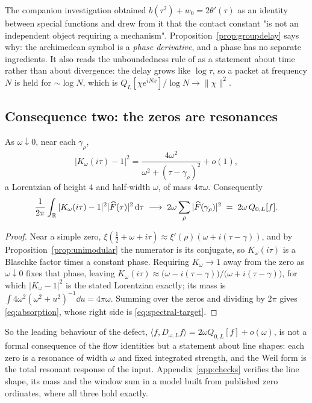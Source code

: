 The companion investigation obtained $b(\tau^2)+w_0=2\theta'(\tau)$ as an identity
between special functions and drew from it that the contact constant "is not an
independent object requiring a mechanism". Proposition~\ref{prop:groupdelay} says
why: the archimedean symbol is a \emph{phase derivative}, and a phase has no
separate ingredients. It also reads the unboundedness rule of \cite{Selection} as
a statement about time rather than about divergence: the delay grows like
$\log\tau$, so a packet at frequency $N$ is held for $\sim\log N$, which is
$Q_L[\chi e^{iNx}]/\log N\to\lVert\chi\rVert^2$.

\subsection{Consequence two: the zeros are resonances}

\begin{proposition}\label{prop:resonance}
As $\omega\downarrow0$, near each $\gamma_\rho$,
\[
 |K_\omega(i\tau)-1|^2=\frac{4\omega^2}{\omega^2+(\tau-\gamma_\rho)^2}+o(1),
\]
a Lorentzian of height $4$ and half-width $\omega$, of mass $4\pi\omega$.
Consequently
\begin{equation}\label{eq:absorption}
 \frac1{2\pi}\int_{\mathbb R}|K_\omega(i\tau)-1|^2|\widehat F(\tau)|^2\,\mathrm d\tau
 \;\longrightarrow\;2\omega\sum_\rho|\widehat F(\gamma_\rho)|^2
 \;=\;2\omega\,Q_{0,L}[f].
\end{equation}
\end{proposition}

\begin{proof}
Near a simple zero, $\xi(\frac12+\omega+i\tau)\approx\xi'(\rho)(\omega+i(\tau-\gamma))$,
and by Proposition~\ref{prop:unimodular} the numerator is its conjugate, so
$K_\omega(i\tau)$ is a Blaschke factor times a constant phase. Requiring
$K_\omega\to1$ away from the zero as $\omega\downarrow0$ fixes that phase, leaving
$K_\omega(i\tau)\approx\big(\omega-i(\tau-\gamma)\big)/\big(\omega+i(\tau-\gamma)\big)$,
for which $|K_\omega-1|^2$ is the stated Lorentzian exactly; its mass is
$\int4\omega^2(\omega^2+u^2)^{-1}\dd u=4\pi\omega$. Summing over the zeros and
dividing by $2\pi$ gives \eqref{eq:absorption}, whose right side is
\eqref{eq:spectral-target}.
\end{proof}

So the leading behaviour of the defect,
$\langle f,D_{\omega,L}f\rangle=2\omega Q_{0,L}[f]+o(\omega)$, is not a formal
consequence of the flow identities but a statement about line shapes: each zero
is a resonance of width $\omega$ and fixed integrated strength, and the Weil form
is the total resonant response of the input. Appendix~\ref{app:checks} verifies
the line shape, its mass and the window sum in a model built from published zero
ordinates, where all three hold exactly.

